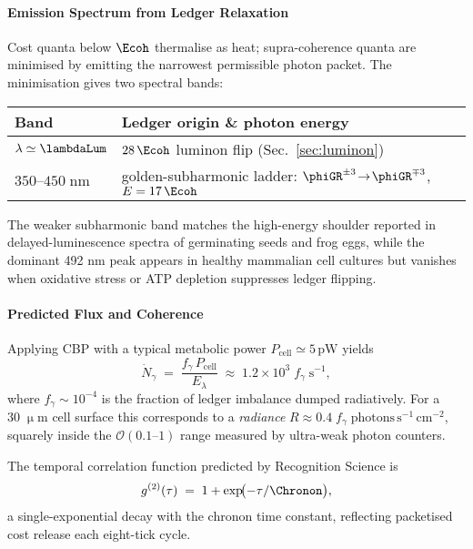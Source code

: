 \documentclass[11pt,oneside]{book}
\begin{document}
{\paragraph{Emission Spectrum from Ledger Relaxation}

Cost quanta below \(\Ecoh\) thermalise as heat; supra-coherence quanta
are minimised by emitting the narrowest permissible photon packet.
The minimisation gives two spectral bands:

\vspace{0.4\baselineskip}
\begin{center}
\begin{tabular}{ll}
\toprule
{\small Band} & {\small Ledger origin \& photon energy} \\
\midrule
\(\lambda\simeq\lambdaLum\) &
$28\,\Ecoh$ luminon flip (Sec.~\ref{sec:luminon}) \\
\(350\text{--}450\;\text{nm}\) &
golden-subharmonic ladder:
$\phiGR^{\pm3}\!\to\!\phiGR^{\mp3}$,
$E=17\,\Ecoh$ \\
\bottomrule
\end{tabular}
\end{center}
\vspace{0.4\baselineskip}

The weaker subharmonic band matches the high-energy shoulder
reported in delayed-luminescence spectra of germinating seeds
and frog eggs, while the dominant 492 nm peak
appears in healthy mammalian cell cultures
but vanishes when oxidative stress or ATP depletion suppresses
ledger flipping.

\paragraph{Predicted Flux and Coherence}

Applying CBP with a typical metabolic power
\(P_{\text{cell}}\simeq5\,\text{pW}\) yields
\[
   \dot N_{\gamma}
   \;=\;
   \frac{f_{\gamma}\,P_{\text{cell}}}{E_{\lambda}}
   \;\approx\;
   1.2\times10^{3}\;f_{\gamma}\;\text{s}^{-1},
\]
where \(f_{\gamma}\sim10^{-4}\) is the
fraction of ledger imbalance dumped radiatively.
For a \(30\;\upmu\text{m}\) cell surface this corresponds to a
\emph{radiance}
\(
   R\approx0.4\;f_{\gamma}\;\text{photons}\,\text{s}^{-1}\,\text{cm}^{-2}
\),
squarely inside the \(\mathcal{O}(0.1\text{--}1)\) range measured by
ultra-weak photon counters.

The temporal correlation function predicted by Recognition Science is
\[
   g^{(2)}(\tau)
   \;=\;
   1+\exp\!\bigl(-\tau/\Chronon\bigr),
\]
a single-exponential decay with the chronon time constant, reflecting
packetised cost release each eight-tick cycle.

}
\end{document}
